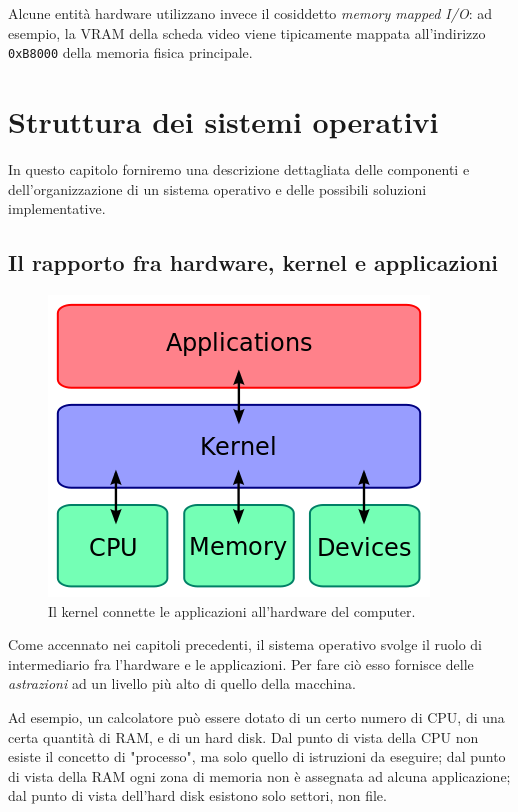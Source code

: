 \documentclass[12pt,a4paper]{report}
\begin{document}
			Alcune entità hardware utilizzano invece il cosiddetto \emph{memory mapped I/O}: ad esempio, la VRAM della scheda
			video viene tipicamente mappata all'indirizzo \texttt{0xB8000} della memoria fisica principale.
				
\chapter{Struttura dei sistemi operativi}
	In questo capitolo forniremo una descrizione dettagliata delle componenti e dell'organizzazione di un sistema operativo e
	delle possibili soluzioni implementative. %
	
	\section{Il rapporto fra hardware, kernel e applicazioni}
		\begin{figure}[htbp]
		\centering
		\includegraphics[scale=0.7]{img/layout.png}
		\caption{Il kernel connette le applicazioni all'hardware del computer. \cite{WIKI_Kernel}\label{fig:layout}}
		\end{figure}
		
		Come accennato nei capitoli precedenti, il sistema operativo svolge il ruolo di intermediario fra l'hardware e
		le applicazioni.
		Per fare ciò esso fornisce delle \emph{astrazioni} ad un livello più alto di quello della macchina.
		
		Ad esempio, un calcolatore può essere dotato di un certo numero di CPU, di una certa quantità
		di RAM, e di un hard disk.
		Dal punto di vista della CPU non esiste il concetto di "processo", ma solo quello di istruzioni da eseguire;
		dal punto di vista della RAM ogni zona di memoria non è assegnata ad alcuna applicazione;
		dal punto di vista dell'hard disk esistono solo settori, non file.
		
\end{document}
